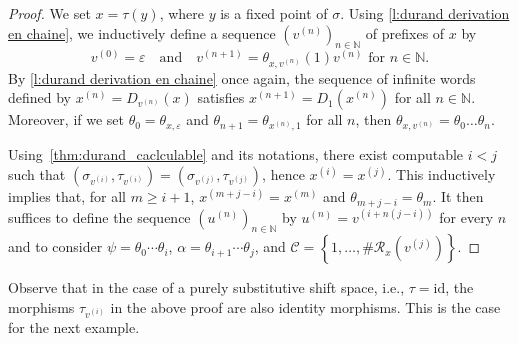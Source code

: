 \documentclass{amsart}
\newcommand*{\nn}{\mathbb{N}}
\newcommand*{\ret}{\mathcal{R}}
\newcommand*{\cC}{\mathcal{C}}
\newcommand*{\id}{\mathrm{id}}
\newcommand*{\emptyw}{\varepsilon}
\newcommand*{\card}{\#}
\theoremstyle{plain}
\theoremstyle{definition}
\theoremstyle{remark}
\begin{document}
\begin{proof}
    We set $x = \tau(y)$, where $y$ is a fixed point of $\sigma$.
    Using \cref{l:durand derivation en chaine}, we inductively define a sequence $(v^{(n)})_{n\in\nn}$ of prefixes of $x$ by 
    \[
        v^{(0)} = \emptyw \quad \text{and} \quad  v^{(n+1)} = \theta_{x,v^{(n)}}(1)v^{(n)} \text{ for } n\in\nn.
    \]
    By \cref{l:durand derivation en chaine} once again, the sequence of infinite words defined by $x^{(n)} = D_{v^{(n)}}(x)$ satisfies $x^{(n+1)} = D_{1}(x^{(n)})$ for all $n \in\nn$. Moreover, if we set $\theta_0 = \theta_{x,\emptyw}$ and $\theta_{n+1} = \theta_{x^{(n)},1}$ for all $n$, then $\theta_{x,v^{(n)}} = \theta_0 \dots \theta_n$.
    
    Using~\cref{thm:durand_caclculable} and its notations, there exist computable $i<j$ such that $(\sigma_{v^{(i)}},\tau_{v^{(i)}}) = (\sigma_{v^{(j)}},\tau_{v^{(j)}})$, hence $x^{(i)} = x^{(j)}$.
    This inductively implies that, for all $m \geq i+1$, $x^{(m+j-i)} = x^{(m)}$ and $\theta_{m+j-i} = \theta_{m}$.
    It then suffices to define the sequence $(u^{(n)})_{n \in \nn}$ by $u^{(n)} = v^{(i+n(j-i))}$ for every $n$ and to consider $\psi = \theta_0 \cdots \theta_i$, $\alpha = \theta_{i+1} \cdots \theta_j$, and $\cC = \left\{1,\dots,\card\ret_x(v^{(j)})\right\}$.
\end{proof}

Observe that in the case of a purely substitutive shift space, i.e., $\tau = \id$, the morphisms $\tau_{v^{(i)}}$ in the above proof are also identity morphisms. This is the case for the next example.
\end{document}
